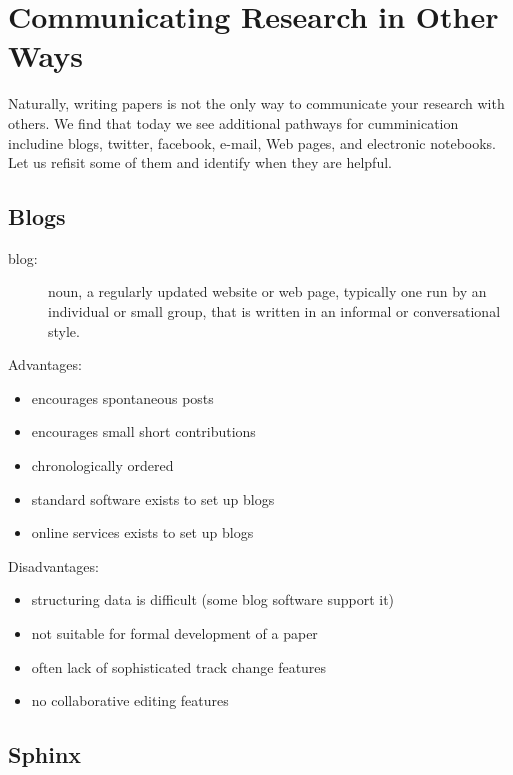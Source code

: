 \FILENAME

\section{Communicating Research in Other Ways}\label{communicating-research}

Naturally, writing papers is not the only way to communicate your
research with others. We find that today we see additional pathways
for cumminication includine blogs, twitter, facebook, e-mail, Web
pages, and electronic notebooks. Let us refisit some of them and
identify when they are helpful.

\subsection{Blogs}\label{blogs}

\begin{description}
\item[blog:]
noun, a regularly updated website or web page, typically one run by an
individual or small group, that is written in an informal or
conversational style.
\end{description}

Advantages:

\begin{itemize}
\tightlist
\item
  encourages spontaneous posts
\item
  encourages small short contributions
\item
  chronologically ordered
\item
  standard software exists to set up blogs
\item
  online services exists to set up blogs
\end{itemize}

Disadvantages:

\begin{itemize}
\tightlist
\item
  structuring data is difficult (some blog software support it)
\item
  not suitable for formal development of a paper
\item
  often lack of sophisticated track change features
\item
  no collaborative editing features
\end{itemize}

\subsection{Sphinx}\label{sphinx}

